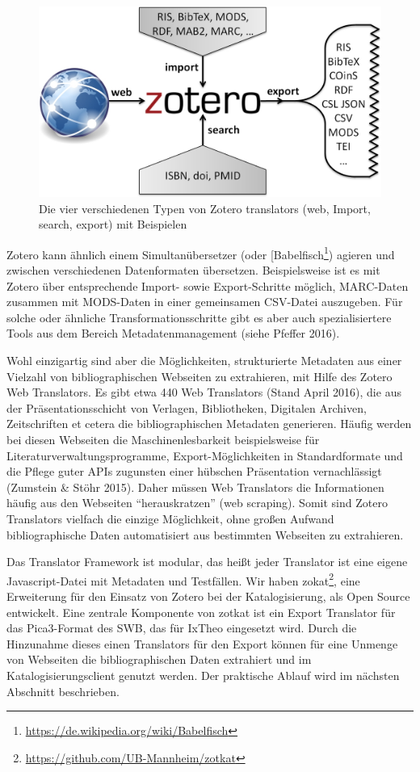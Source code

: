 \documentclass[a4paper,
fontsize=11pt,
oneside,
numbers=noperiodatend,
parskip=half-,
bibliography=totoc,
final
]{scrartcl}
\begin{document}
\begin{figure}[htbp]
\centering
\includegraphics{img/Zotero-Translators.jpg}
\caption{Die vier verschiedenen Typen von Zotero translators (web,
Im\-port, search, export) mit Beispielen}
\end{figure}

Zotero kann ähnlich einem Simultanübersetzer (oder
{[}Babelfisch\footnote{\url{https://de.wikipedia.org/wiki/Babelfisch}})
agieren und zwischen verschiedenen Datenformaten übersetzen.
Beispielsweise ist es mit Zotero über entsprechende Im\-port- sowie
Export-Schritte möglich, MARC-Daten zusammen mit MODS-Daten in einer
gemeinsamen CSV-Datei auszugeben. Für solche oder ähnliche
Transformationsschritte gibt es aber auch spezialisiertere Tools aus dem
Bereich Metadatenmanagement (siehe Pfeffer 2016).

Wohl einzigartig sind aber die Möglichkeiten, strukturierte Metadaten
aus einer Vielzahl von bibliographischen Webseiten zu extrahieren, mit
Hilfe des Zotero Web Translators. Es gibt etwa 440 Web Translators
(Stand April 2016), die aus der Präsentationsschicht von Verlagen,
Bibliotheken, Digitalen Archiven, Zeitschriften et cetera die
bibliographischen Metadaten generieren. Häufig werden bei diesen
Webseiten die Maschinenlesbarkeit beispielsweise für
Literaturverwaltungsprogramme, Export-Möglichkeiten in Standardformate
und die Pflege guter APIs zugunsten einer hübschen Präsentation
vernachlässigt (Zumstein \& Stöhr 2015). Daher müssen Web Translators
die Informationen häufig aus den Webseiten \enquote{herauskratzen} (web
scraping). Somit sind Zotero Translators vielfach die einzige
Möglichkeit, ohne großen Aufwand bibliographische Daten automatisiert
aus bestimmten Webseiten zu extrahieren.

Das Translator Framework ist modular, das heißt jeder Translator ist
eine eigene Javascript-Datei mit Metadaten und Testfällen. Wir haben
zokat\footnote{\url{https://github.com/UB-Mannheim/zotkat}}, eine
Erweiterung für den Einsatz von Zotero bei der Katalogisierung, als Open
Source entwickelt. Eine zentrale Komponente von zotkat ist ein Export
Translator für das Pica3-Format des SWB, das für IxTheo eingesetzt wird.
Durch die Hinzunahme dieses einen Translators für den Export können für
eine Unmenge von Webseiten die bibliographischen Daten extrahiert und im
Katalogisierungsclient genutzt werden. Der praktische Ablauf wird im
nächsten Abschnitt beschrieben.
\end{document}
